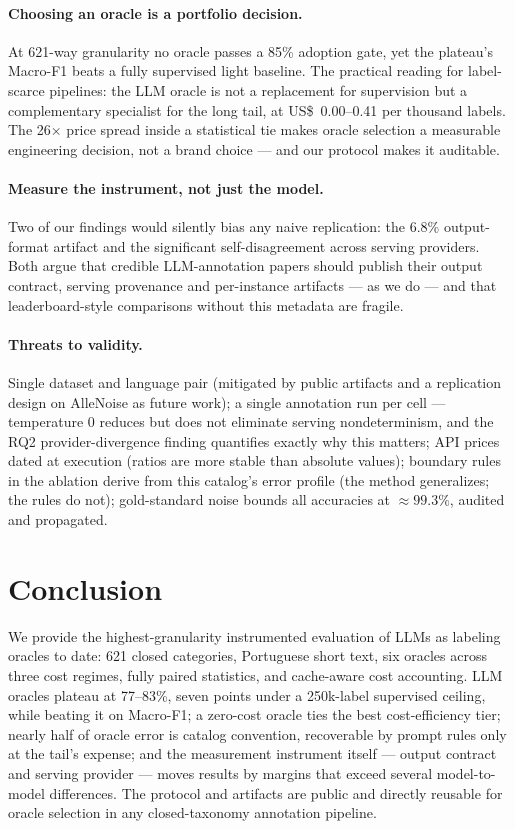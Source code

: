 \documentclass[11pt]{article}
\begin{document}
\paragraph{Choosing an oracle is a portfolio decision.} At 621-way
granularity no oracle passes a 85\% adoption gate, yet the plateau's
Macro-F1 beats a fully supervised light baseline. The practical reading
for label-scarce pipelines: the LLM oracle is not a replacement for
supervision but a complementary specialist for the long tail, at
US\$~0.00--0.41 per thousand labels. The 26$\times$ price spread inside a
statistical tie makes oracle selection a measurable engineering decision,
not a brand choice --- and our protocol makes it auditable.

\paragraph{Measure the instrument, not just the model.} Two of our
findings would silently bias any naive replication: the 6.8\%
output-format artifact and the significant self-disagreement across
serving providers. Both argue that credible LLM-annotation papers should
publish their output contract, serving provenance and per-instance
artifacts --- as we do --- and that leaderboard-style comparisons without
this metadata are fragile.

\paragraph{Threats to validity.} Single dataset and language pair
(mitigated by public artifacts and a replication design on AlleNoise
\citep{Raczkowska2024AlleNoise} as future work); a single annotation run
per cell --- temperature 0 reduces but does not eliminate serving
nondeterminism, and the RQ2 provider-divergence finding quantifies exactly
why this matters; API prices dated at execution (ratios are more stable
than absolute values); boundary rules in the ablation derive from this
catalog's error profile (the method generalizes; the rules do not);
gold-standard noise bounds all accuracies at $\approx 99.3\%$, audited and
propagated.

\section{Conclusion}
\label{sec:conclusion}

We provide the highest-granularity instrumented evaluation of LLMs as
labeling oracles to date: 621 closed categories, Portuguese short text,
six oracles across three cost regimes, fully paired statistics, and
cache-aware cost accounting. LLM oracles plateau at 77--83\%, seven points
under a 250k-label supervised ceiling, while beating it on Macro-F1; a
zero-cost oracle ties the best cost-efficiency tier; nearly half of oracle
error is catalog convention, recoverable by prompt rules only at the
tail's expense; and the measurement instrument itself --- output contract
and serving provider --- moves results by margins that exceed several
model-to-model differences. The protocol and artifacts are public and
directly reusable for oracle selection in any closed-taxonomy annotation
pipeline.
\end{document}

